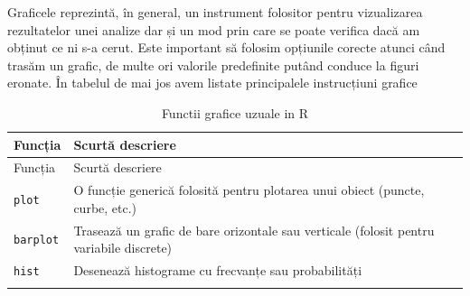 \documentclass[]{article}
\begin{document}
Graficele reprezintă, în general, un instrument folositor pentru
vizualizarea rezultatelor unei analize dar și un mod prin care se poate
verifica dacă am obținut ce ni s-a cerut. Este important să folosim
opțiunile corecte atunci când trasăm un grafic, de multe ori valorile
predefinite putând conduce la figuri eronate. În tabelul de mai jos avem
listate principalele instrucțiuni grafice

\begin{longtable}[]{@{}ll@{}}
\caption{Functii grafice uzuale in R}\tabularnewline
\toprule
\begin{minipage}[b]{0.37\columnwidth}\raggedright\strut
Funcția\strut
\end{minipage} & \begin{minipage}[b]{0.34\columnwidth}\raggedright\strut
Scurtă descriere\strut
\end{minipage}\tabularnewline
\midrule
\endfirsthead
\toprule
\begin{minipage}[b]{0.37\columnwidth}\raggedright\strut
Funcția\strut
\end{minipage} & \begin{minipage}[b]{0.34\columnwidth}\raggedright\strut
Scurtă descriere\strut
\end{minipage}\tabularnewline
\midrule
\endhead
\begin{minipage}[t]{0.37\columnwidth}\raggedright\strut
\texttt{plot}\strut
\end{minipage} & \begin{minipage}[t]{0.34\columnwidth}\raggedright\strut
O funcție generică folosită pentru plotarea unui obiect (puncte, curbe,
etc.)\strut
\end{minipage}\tabularnewline
\begin{minipage}[t]{0.37\columnwidth}\raggedright\strut
\texttt{barplot}\strut
\end{minipage} & \begin{minipage}[t]{0.34\columnwidth}\raggedright\strut
Trasează un grafic de bare orizontale sau verticale (folosit pentru
variabile discrete)\strut
\end{minipage}\tabularnewline
\begin{minipage}[t]{0.37\columnwidth}\raggedright\strut
\texttt{hist}\strut
\end{minipage} & \begin{minipage}[t]{0.34\columnwidth}\raggedright\strut
Desenează histograme cu frecvanțe sau probabilități\strut
\end{minipage}\tabularnewline
\begin{minipage}[t]{0.37\columnwidth}\raggedright\strut

\end{minipage}
\end{longtable}
\end{document}
